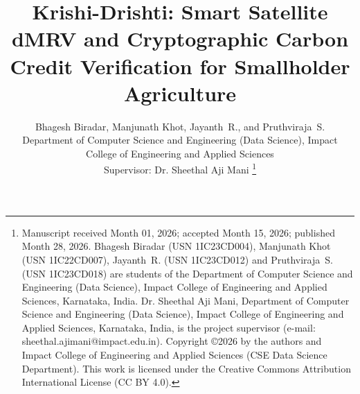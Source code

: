 \documentclass[10pt,a4paper,twocolumn]{IEEEtran}
\begin{document}
\title{Krishi-Drishti: Smart Satellite dMRV and Cryptographic Carbon Credit Verification for Smallholder Agriculture}

\author{Bhagesh Biradar, Manjunath Khot, Jayanth~R., and Pruthviraja~S.\\
\small Department of Computer Science and Engineering (Data Science), Impact College of Engineering and Applied Sciences\\
\small Supervisor: Dr. Sheethal Aji Mani%
\thanks{Manuscript received Month 01, 2026; accepted Month 15, 2026; published Month 28, 2026.\newline
\hspace*{1em}Bhagesh Biradar (USN 1IC23CD004), Manjunath Khot (USN 1IC22CD007), Jayanth~R. (USN 1IC23CD012) and Pruthviraja~S. (USN 1IC23CD018) are students of the Department of Computer Science and Engineering (Data Science), Impact College of Engineering and Applied Sciences, Karnataka, India.\newline
\hspace*{1em}Dr. Sheethal Aji Mani, Department of Computer Science and Engineering (Data Science), Impact College of Engineering and Applied Sciences, Karnataka, India, is the project supervisor (e-mail: sheethal.ajimani@impact.edu.in).\newline
\hspace*{1em}Copyright \copyright 2026 by the authors and Impact College of Engineering and Applied Sciences (CSE Data Science Department). This work is licensed under the Creative Commons Attribution International License (CC BY 4.0).}}

\pagestyle{empty}

\maketitle
\thispagestyle{empty}
\end{document}
